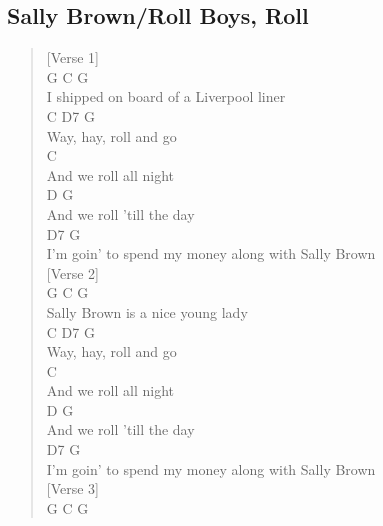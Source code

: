 \documentclass[11pt]{article}
\begin{document}
\subsection{Sally Brown/Roll Boys, Roll}
\label{sec:orgd59ac02}
\begin{verse}
[Verse 1]\\
\vspace*{1em}
G                            C       G\\
I shipped on board of a Liverpool liner\\
\hspace*{5em}C     D7      G\\
Way, hay, roll and go\\
\hspace*{18em}C\\
And we roll all night\\
\hspace*{8em}D              G\\
And we roll 'till the day\\
\hspace*{41em}D7    G\\
I'm goin' to spend my money along with Sally Brown\\
\vspace*{1em}
\vspace*{1em}
[Verse 2]\\
\vspace*{1em}
G                 C          G\\
Sally Brown is a nice young lady\\
\hspace*{5em}C     D7      G\\
Way, hay, roll and go\\
\hspace*{18em}C\\
And we roll all night\\
\hspace*{8em}D              G\\
And we roll 'till the day\\
\hspace*{41em}D7    G\\
I'm goin' to spend my money along with Sally Brown\\
\vspace*{1em}
\vspace*{1em}
[Verse 3]\\
\vspace*{1em}
G                                    C        G\\

\end{verse}
\end{document}
